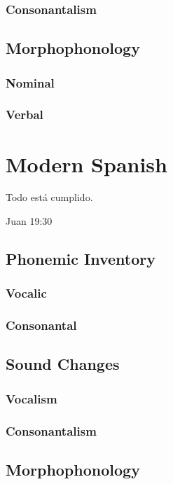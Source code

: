 \documentclass{report}
\begin{document}
\subsection{Consonantalism}

\section{Morphophonology}

\subsection{Nominal}

\subsection{Verbal}

\chapter{Modern Spanish}

\epigraph{Todo está cumplido.}{Juan 19:30}

\section{Phonemic Inventory}

\subsection{Vocalic}

\subsection{Consonantal}

\section{Sound Changes}

\subsection{Vocalism}

\subsection{Consonantalism}

\section{Morphophonology}
\end{document}
